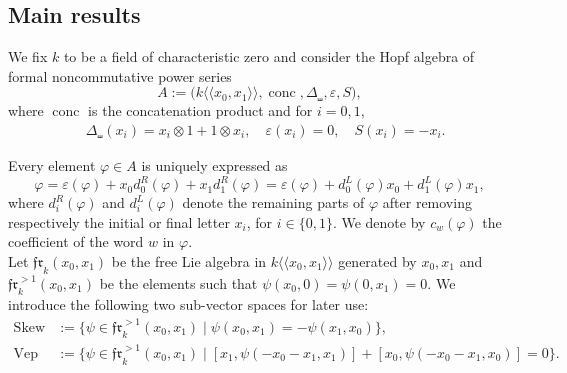 \documentclass[a4paper,fleqn]{cas-sc}
\newcommand{\kk}{k\langle \langle x_0, x_1 \rangle \rangle}
\DeclareMathOperator{\conc}{conc}
\begin{document}


\subsection{Main results}
We fix $k$ to be a field of characteristic zero and consider the Hopf algebra of formal noncommutative power series 
\begin{equation}
\label{eq:def-hopf-algebra-A}
    A := 
    \big( \kk, \conc, \Delta_\shuffle, \varepsilon,S \big),
\end{equation}
where $\conc$ is the concatenation product and for $i=0,1$, 
\begin{equation*}
    \begin{split}
        & \Delta_\shuffle(x_i) = x_i \otimes 1 + 1 \otimes x_i, \quad \varepsilon(x_i) = 0, \quad S(x_i)=-x_i. 
    \end{split}
\end{equation*}

Every element $\varphi\in A$ %
is uniquely expressed as
\begin{equation}\label{eq:decomposition}
\varphi =\varepsilon(\varphi)+ x_0 d^R_0(\varphi) + x_1 d^R_1(\varphi)
    =\varepsilon(\varphi)+ d^{L}_0(\varphi) x_0 + d^{L}_1 (\varphi)x_1,
\end{equation}
where %
$d_i^R(\varphi)$ and $d_i^L(\varphi)$ denote the remaining parts of $\varphi$ after removing respectively the initial or final letter $x_i$, for $i \in \{0,1\}$. We denote by $c_{w}(\varphi)$ the coefficient of the word $w$ in $\varphi$. \\


Let $\mathfrak{fr}_k(x_0,x_1)$ be the free Lie algebra in $k\langle\langle x_0,x_1\rangle\rangle$ generated by $x_0,x_1$ and $\mathfrak{fr}^{>1}_k(x_0,x_1)$ be the elements such that $\psi(x_0,0)=\psi(0,x_1)=0$. We introduce the following two sub-vector spaces for later use:
\begin{align}
 \mathrm{Skew} & :=\{\psi\in \mathfrak{fr}^{>1}_k(x_0,x_1)\mid \psi(x_0,x_1)=-\psi(x_1,x_0)\}, \label{def:Skew} \\
 \mathrm{Vep} & :=\{\psi\in \mathfrak{fr}^{>1}_k(x_0,x_1)\mid [x_1,\psi(-x_0-x_1,x_1)]+[x_0,\psi(-x_0-x_1,x_0)]=0\}. \label{def:Vep}
\end{align}
\end{document}
